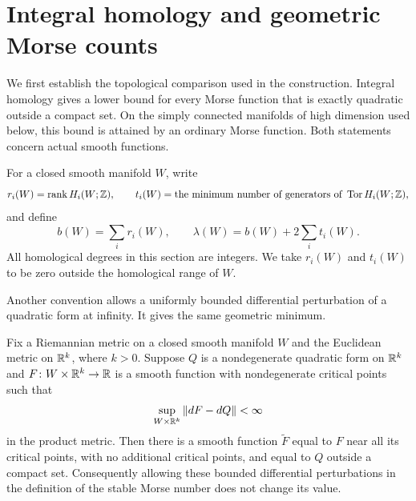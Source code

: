 \section{Integral homology and geometric Morse counts}\label{sec:morse}

We first establish the topological comparison used in the construction.
Integral homology gives a lower bound for every Morse function that is exactly
quadratic outside a compact set.  On the simply connected manifolds of high
dimension used below, this bound is attained by an ordinary Morse function.
Both statements concern actual smooth functions.

For a closed smooth manifold $W$, write
\[
 r_i(W)=\operatorname{rank} H_i(W;\mathbb Z),\qquad
 t_i(W)=\text{the minimum number of generators of }\operatorname{Tor} H_i(W;\mathbb Z),
\]
and define
\begin{equation}\label{eq:lambda-definition}
 b(W)=\sum_i r_i(W),\qquad
 \lambda(W)=b(W)+2\sum_i t_i(W).
\end{equation}
All homological degrees in this section are integers.  We take $r_i(W)$ and
$t_i(W)$ to be zero outside the homological range of $W$.

Another convention allows a uniformly bounded differential perturbation
of a quadratic form at infinity.  It gives the same geometric minimum.

\begin{lemma}\label{lem:infinity-conventions}
Fix a Riemannian metric on a closed smooth manifold $W$ and the Euclidean
metric on $\mathbb R^k$, where $k>0$.  Suppose $Q$ is a nondegenerate quadratic
form on $\mathbb R^k$ and $F\colon W\times\mathbb R^k\to\mathbb R$ is a smooth function
with nondegenerate critical points such that
\[
 \sup_{W\times\mathbb R^k}\|dF-dQ\|<\infty
\]
in the product metric.  Then there is a smooth function $\widetilde F$
equal to $F$ near all its critical points, with no additional critical
points, and equal to $Q$ outside a compact set.  Consequently allowing
these bounded differential perturbations in the definition of the stable
Morse number does not change its value.
\end{lemma}

